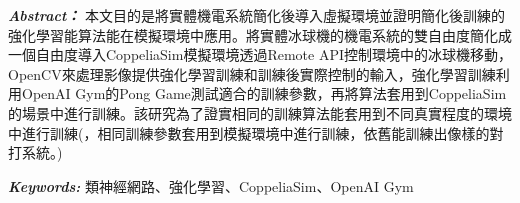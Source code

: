 \begin{flushleft}\textit{\textbf{Abstract：}}
本文目的是將實體機電系統簡化後導入虛擬環境並證明簡化後訓練的強化學習能算法能在模擬環境中應用。將實體冰球機的機電系統的雙自由度簡化成一個自由度導入CoppeliaSim模擬環境透過Remote API控制環境中的冰球機移動，OpenCV來處理影像提供強化學習訓練和訓練後實際控制的輸入，強化學習訓練利用OpenAI Gym的Pong Game測試適合的訓練參數，再將算法套用到CoppeliaSim的場景中進行訓練。該研究為了證實相同的訓練算法能套用到不同真實程度的環境中進行訓練(，相同訓練參數套用到模擬環境中進行訓練，依舊能訓練出像樣的對打系統。)\\
\end{flushleft}
\begin{flushleft}
\textit{\textbf{Keywords:}} 類神經網路、強化學習、\sectionef CoppeliaSim、OpenAI Gym
\end{flushleft}
